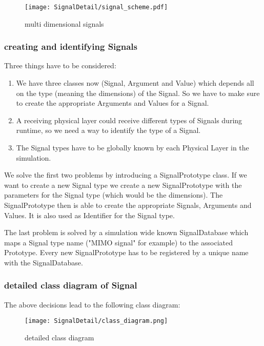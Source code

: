 \begin{figure}[H]
 \centering
 \texttt{[image: SignalDetail/signal\_scheme.pdf]}
 \caption{multi dimensional signals}
 \label{fig:signalscheme}
\end{figure}

\subsubsection{creating and identifying Signals}

Three things have to be considered:

\begin{enumerate}
\item We have three classes now (Signal, Argument and Value) which depends all on the type (meaning the dimensions) of the Signal. So we have to make sure to create the appropriate Arguments and Values for a Signal.
\item A receiving physical layer could receive different types of Signals during runtime, so we need a way to identify the type of a Signal.
\item The Signal types have to be globally known by each Physical Layer in the simulation.
\end{enumerate}

We solve the first two problems by introducing a SignalPrototype class. If we want to create a new Signal type we create a new SignalPrototype with the parameters for the Signal type (which would be the dimensions). The SignalPrototype then is able to create the appropriate Signals, Arguments and Values. It is also used as Identifier for the Signal type.

The last problem is solved by a simulation wide known SignalDatabase which maps 
a Signal type name ("MIMO signal" for example) to the associated Prototype.
Every new SignalPrototype has to be registered by a unique name with the
SignalDatabase. 

\subsubsection{detailed class diagram of Signal}

The above decisions lead to the following class diagram:

\begin{figure}[H]
 \centering
 \texttt{[image: SignalDetail/class\_diagram.png]}
 \caption{detailed class diagram}
 \label{fig: signal classgraph}
\end{figure}

